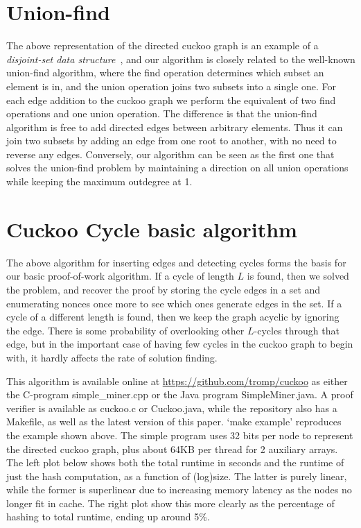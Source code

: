 \documentclass[11pt, oneside]{article}
\begin{document}
\section{Union-find}
The above representation of the directed cuckoo graph is an example of
a {\em disjoint-set data structure}~\cite{wikidsds2014}, and our algorithm is
closely related to the well-known union-find algorithm, where the find operation
determines which subset an element is in, and the union operation joins two subsets
into a single one. For each edge addition to the cuckoo graph we perform the equivalent
of two find operations and one union operation.
The difference is that the union-find algorithm is free to add
directed edges between arbitrary elements. Thus it can join two subsets by adding an edge
from one root to another, with no need to reverse any edges. Conversely, our algorithm
can be seen as the first one that solves the union-find problem by maintaining
a direction on all union operations while keeping the maximum outdegree at 1.

\section{Cuckoo Cycle basic algorithm}
The above algorithm for inserting edges and detecting cycles forms the basis
for our basic proof-of-work algorithm.
If a cycle of length $L$ is found, then we solved the problem, and recover the proof
by storing the cycle edges in a set and enumerating nonces once more to see which ones
generate edges in the set.
If a cycle of a different length is found, then we keep the graph acyclic by ignoring the edge.
There is some probability of overlooking other $L$-cycles
through that edge, but in the important case of having few cycles
in the cuckoo graph to begin with, it hardly affects the rate of solution finding.

This algorithm is available online at \url{https://github.com/tromp/cuckoo}
as either the C-program simple\_miner.cpp or the Java program SimpleMiner.java.
A proof verifier is available as cuckoo.c or Cuckoo.java, while the repository
also has a Makefile, as well as the latest version of this paper.
`make example' reproduces the example shown above.
The simple program uses 32 bits per node to represent the directed cuckoo graph,
plus about 64KB per thread for 2 auxiliary arrays.
The left plot below shows both the total runtime in seconds and the runtime of just
the hash computation, as a function of (log)size. The latter is purely
linear, while the former is superlinear due to increasing memory latency
as the nodes no longer fit in cache. The right plot show this more clearly
as the percentage of hashing to total runtime, ending up around 5\%.
\end{document}
